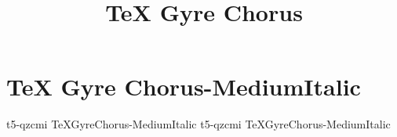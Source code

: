 \documentclass[sample]{vnsample}
\title{TeX Gyre Chorus}
\begin{document}
\section{TeX Gyre Chorus-MediumItalic}
    {t5-qzcmi}     {TeXGyreChorus-MediumItalic}
    {t5-qzcmi}     {TeXGyreChorus-MediumItalic}
\end{document}
